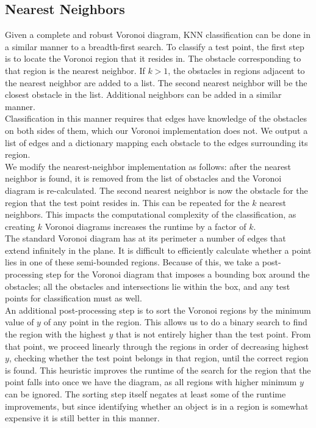 \documentclass[conference]{IEEEtran}
\begin{document}
\subsection{Nearest Neighbors}
Given a complete and robust Voronoi diagram, KNN classification can be done
in a similar manner to a breadth-first search. To classify a test point, the
first step is to locate the Voronoi region that it resides in. The obstacle
corresponding to that region is the nearest neighbor. If $k>1$, the obstacles
in regions adjacent to the nearest neighbor are added to a list. The second
nearest neighbor will be the closest obstacle in the list. Additional neighbors
can be added in a similar manner.\\
\indent Classification in this manner requires that edges have knowledge of
the obstacles on both sides of them, which our Voronoi implementation does
not. We output a list of edges and a dictionary mapping each obstacle to
the edges surrounding its region.\\
\indent We modify the nearest-neighbor implementation
as follows: after the nearest neighbor is found, it is removed from the list
of obstacles and the Voronoi diagram is re-calculated. The second nearest
neighbor is now the obstacle for the region that the test point resides in.
This can be repeated for the $k$ nearest neighbors. This impacts
the computational complexity of the classification, as creating $k$ Voronoi
diagrams increases the runtime by a factor of $k$.\\
\indent The standard Voronoi diagram has at its perimeter a number of edges
that extend infinitely in the plane. It is difficult to efficiently calculate
whether a point lies in one of these semi-bounded regions. Because of this,
we take a post-processing step for the Voronoi diagram that imposes a bounding
box around the obstacles; all the obstacles and intersections lie within
the box, and any test points for classification must as well.\\
\indent An additional post-processing step is to sort the Voronoi regions
by the minimum value of $y$ of any point in the region. This allows us to
do a binary search to find the region with the highest $y$ that is not
entirely higher than the test point. From that point, we proceed linearly
through the regions in order of decreasing highest $y$, checking whether
the test point belongs in that region, until the correct region is found.
This heuristic improves the runtime
of the search for the region that the point falls into once we have the
diagram, as all regions with higher minimum $y$ can be ignored. The
sorting step itself negates at least some of the runtime improvements, but
since identifying whether an object is in a region is somewhat expensive
it is still better  in this manner.
\end{document}
